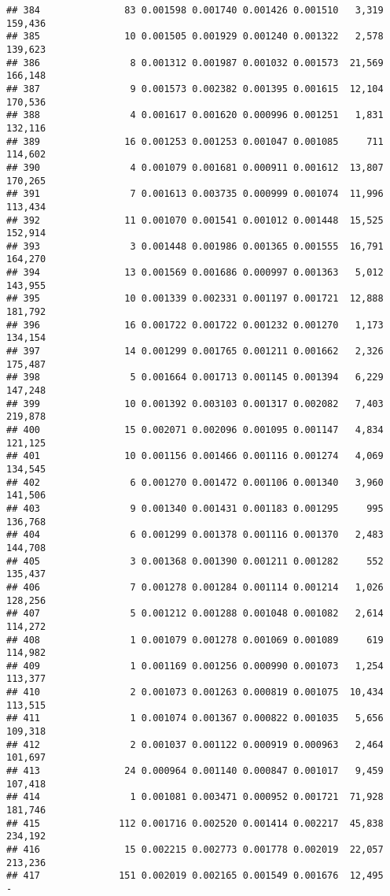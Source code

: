 \documentclass[]{article}
\begin{document}
\begin{verbatim}
## 384               83 0.001598 0.001740 0.001426 0.001510   3,319   159,436
## 385               10 0.001505 0.001929 0.001240 0.001322   2,578   139,623
## 386                8 0.001312 0.001987 0.001032 0.001573  21,569   166,148
## 387                9 0.001573 0.002382 0.001395 0.001615  12,104   170,536
## 388                4 0.001617 0.001620 0.000996 0.001251   1,831   132,116
## 389               16 0.001253 0.001253 0.001047 0.001085     711   114,602
## 390                4 0.001079 0.001681 0.000911 0.001612  13,807   170,265
## 391                7 0.001613 0.003735 0.000999 0.001074  11,996   113,434
## 392               11 0.001070 0.001541 0.001012 0.001448  15,525   152,914
## 393                3 0.001448 0.001986 0.001365 0.001555  16,791   164,270
## 394               13 0.001569 0.001686 0.000997 0.001363   5,012   143,955
## 395               10 0.001339 0.002331 0.001197 0.001721  12,888   181,792
## 396               16 0.001722 0.001722 0.001232 0.001270   1,173   134,154
## 397               14 0.001299 0.001765 0.001211 0.001662   2,326   175,487
## 398                5 0.001664 0.001713 0.001145 0.001394   6,229   147,248
## 399               10 0.001392 0.003103 0.001317 0.002082   7,403   219,878
## 400               15 0.002071 0.002096 0.001095 0.001147   4,834   121,125
## 401               10 0.001156 0.001466 0.001116 0.001274   4,069   134,545
## 402                6 0.001270 0.001472 0.001106 0.001340   3,960   141,506
## 403                9 0.001340 0.001431 0.001183 0.001295     995   136,768
## 404                6 0.001299 0.001378 0.001116 0.001370   2,483   144,708
## 405                3 0.001368 0.001390 0.001211 0.001282     552   135,437
## 406                7 0.001278 0.001284 0.001114 0.001214   1,026   128,256
## 407                5 0.001212 0.001288 0.001048 0.001082   2,614   114,272
## 408                1 0.001079 0.001278 0.001069 0.001089     619   114,982
## 409                1 0.001169 0.001256 0.000990 0.001073   1,254   113,377
## 410                2 0.001073 0.001263 0.000819 0.001075  10,434   113,515
## 411                1 0.001074 0.001367 0.000822 0.001035   5,656   109,318
## 412                2 0.001037 0.001122 0.000919 0.000963   2,464   101,697
## 413               24 0.000964 0.001140 0.000847 0.001017   9,459   107,418
## 414                1 0.001081 0.003471 0.000952 0.001721  71,928   181,746
## 415              112 0.001716 0.002520 0.001414 0.002217  45,838   234,192
## 416               15 0.002215 0.002773 0.001778 0.002019  22,057   213,236
## 417              151 0.002019 0.002165 0.001549 0.001676  12,495         -

\end{verbatim}
\end{document}
